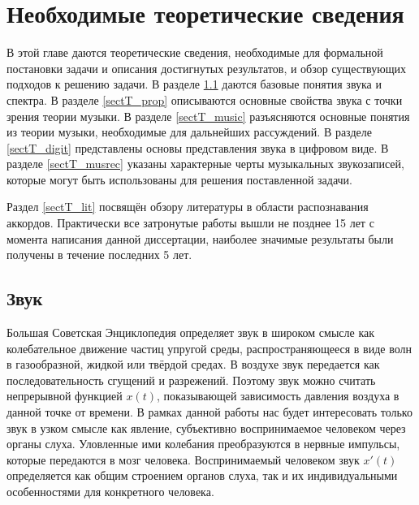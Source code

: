 \chapter{Необходимые теоретические сведения} \label{chaptT}

В этой главе даются теоретические сведения, необходимые для формальной
постановки задачи и описания достигнутых результатов, и обзор существующих
подходов к решению задачи. В разделе \ref{sectT_sound} даются базовые понятия
звука и спектра. В разделе \ref{sectT_prop} описываются основные свойства звука
с точки зрения теории музыки. В разделе \ref{sectT_music} разъясняются основные
понятия из теории музыки, необходимые для дальнейших рассуждений. В разделе
\ref{sectT_digit} представлены основы представления звука в цифровом виде.
В разделе \ref{sectT_musrec} указаны характерные черты музыкальных звукозаписей,
которые могут быть использованы для решения поставленной задачи.

Раздел \ref{sectT_lit} посвящён обзору литературы в области распознавания
аккордов. Практически все затронутые работы вышли не позднее 15 лет с момента
написания данной диссертации, наиболее значимые результаты были получены в
течение последних 5 лет.


\section{Звук} \label{sectT_sound}

Большая Советская Энциклопедия определяет звук в широком смысле как
колебательное движение частиц упругой среды, распространяющееся в виде волн в
газообразной, жидкой или твёрдой средах. В воздухе звук передается как
последовательность сгущений и разрежений. Поэтому звук можно считать непрерывной
функцией $x(t)$, показывающей зависимость давления воздуха в данной точке от
времени. В рамках данной работы нас будет интересовать только звук в узком
смысле как явление, субъективно воспринимаемое человеком через органы слуха.
Уловленные ими колебания преобразуются в нервные импульсы, которые передаются в
мозг человека. Воспринимаемый человеком звук $x'(t)$ определяется как общим
строением органов слуха, так и их индивидуальными особенностями для конкретного
человека.

